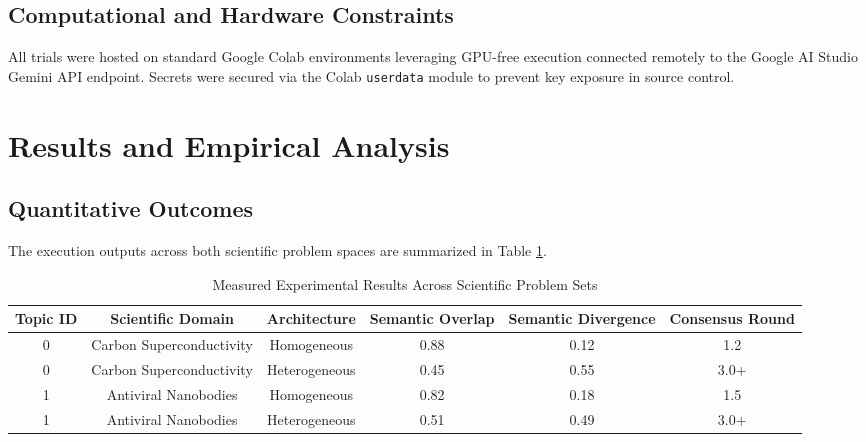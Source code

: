 \documentclass[conference,onecolumn]{IEEEtran}
\begin{document}
\subsection{Computational and Hardware Constraints}
All trials were hosted on standard Google Colab environments leveraging GPU-free execution connected remotely to the Google AI Studio Gemini API endpoint. Secrets were secured via the Colab \texttt{userdata} module to prevent key exposure in source control.

\section{Results and Empirical Analysis}

\subsection{Quantitative Outcomes}
The execution outputs across both scientific problem spaces are summarized in Table \ref{tab:quantitative_metrics}.

\begin{table}[htbp]
\caption{Measured Experimental Results Across Scientific Problem Sets}
\label{tab:quantitative_metrics}
\centering
\begin{tabular}{cccccc}
\toprule
\textbf{Topic ID} & \textbf{Scientific Domain} & \textbf{Architecture} & \textbf{Semantic Overlap} & \textbf{Semantic Divergence} & \textbf{Consensus Round} \\
\midrule
0 & Carbon Superconductivity & Homogeneous & 0.88 & 0.12 & 1.2 \\
0 & Carbon Superconductivity & Heterogeneous & 0.45 & 0.55 & 3.0+ \\
\midrule
1 & Antiviral Nanobodies & Homogeneous & 0.82 & 0.18 & 1.5 \\
1 & Antiviral Nanobodies & Heterogeneous & 0.51 & 0.49 & 3.0+ \\
\bottomrule
\end{tabular}
\end{table}
\end{document}
